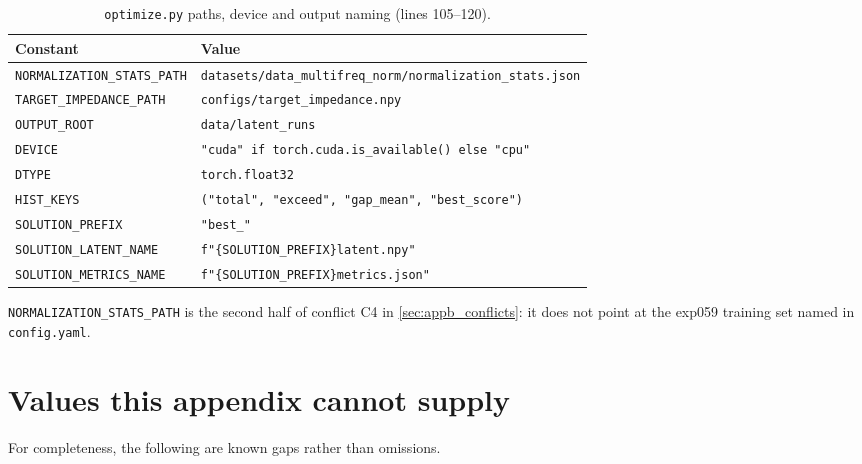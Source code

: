 \begin{table}[htbp]
\centering
\caption{\texttt{optimize.py} paths, device and output naming (lines 105--120).}
\label{tab:appb_opt_paths}
\begin{tabular}{@{}lp{}@{}}
\hline
Constant & Value \\
\hline
\texttt{NORMALIZATION\_STATS\_PATH} & \texttt{datasets/\allowbreak data\_multifreq\_norm/\allowbreak normalization\_stats.json} \\
\texttt{TARGET\_IMPEDANCE\_PATH} & \texttt{configs/\allowbreak target\_impedance.npy} \\
\texttt{OUTPUT\_ROOT} & \texttt{data/latent\_runs} \\
\texttt{DEVICE} & \texttt{"cuda" if torch.cuda.is\_available() else "cpu"} \\
\texttt{DTYPE} & \texttt{torch.float32} \\
\texttt{HIST\_KEYS} & \texttt{("total", "exceed", "gap\_mean", "best\_score")} \\
\texttt{SOLUTION\_PREFIX} & \texttt{"best\_"} \\
\texttt{SOLUTION\_LATENT\_NAME} & \texttt{f"\{SOLUTION\_PREFIX\}latent.npy"} \\
\texttt{SOLUTION\_METRICS\_NAME} & \texttt{f"\{SOLUTION\_PREFIX\}metrics.json"} \\
\hline
\end{tabular}
\end{table}

\texttt{NORMALIZATION\_STATS\_PATH} is the second half of conflict C4 in
\autoref{sec:appb_conflicts}: it does not point at the exp059 training set named in
\texttt{config.yaml}.

\clearpage

\section{Values this appendix cannot supply}
\label{sec:appb_missing}

For completeness, the following are known gaps rather than omissions.

